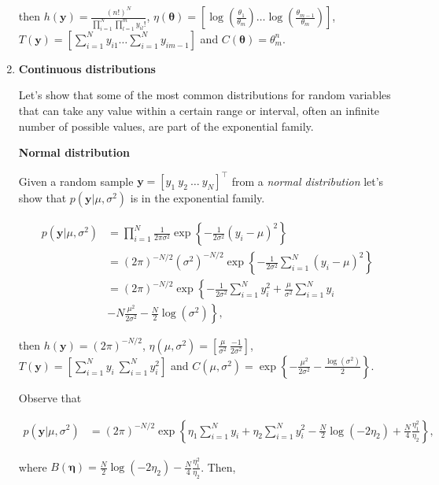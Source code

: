 \begin{enumerate}
then $h(\bm{y})=\frac{(n!)^N}{\prod_{i=1}^N\prod_{l=1}^m y_{il}!}$, $\eta(\bm{\theta})=\left[\log\left(\frac{\theta_1}{\theta_m}\right)\dots \log\left(\frac{\theta_{m-1}}{\theta_m}\right)\right]$, $T(\bm{y})=\left[\sum_{i=1}^N y_{i1}\dots \sum_{i=1}^N y_{im-1}\right]$ and $C(\bm{\theta})=\theta_m^n$.\\

\item \textbf{Continuous distributions}

Let's show that some of the most common distributions for random variables that can take any value within a certain range or interval, often an infinite number of possible values, are part of the exponential family.

\textbf{Normal distribution} 

Given a random sample $\bm{y}=[y_1 \ y_2 \ \dots \ y_N]^{\top}$ from a \textit{normal distribution} let's show that $p(\bm{y}|\mu,\sigma^2)$ is in the exponential family.

\begin{align}
	p(\bm{y}|\mu,\sigma^2)&=\prod_{i=1}^N \frac{1}{2\pi\sigma^2}\exp\left\{-\frac{1}{2\sigma^2}\left(y_i-\mu\right)^2\right\}\nonumber\\
	&= (2\pi)^{-N/2}(\sigma^2)^{-N/2}\exp\left\{-\frac{1}{2\sigma^2}\sum_{i=1}^N\left(y_i-\mu\right)^2\right\}\nonumber\\
	&= (2\pi)^{-N/2}\exp\left\{-\frac{1}{2\sigma^2}\sum_{i=1}^Ny_i^2+\frac{\mu}{\sigma^2}\sum_{i=1}^N y_i\right.\nonumber\\
	&-\left.N\frac{\mu^2}{2\sigma^2}-\frac{N}{2}\log(\sigma^2)\right\}\nonumber,	
\end{align}

then $h(\bm{y})=(2\pi)^{-N/2}$, $\eta(\mu,\sigma^2)=\left[\frac{\mu}{\sigma^2} \ \frac{-1}{2\sigma^2}\right]$, $T(\bm{y})=\left[\sum_{i=1}^N y_i \ \sum_{i=1}^N y_i^2\right]$ and $C(\mu,\sigma^2)=\exp\left\{-\frac{\mu^2}{2\sigma^2}-\frac{\log(\sigma^2)}{2}\right\}$.

Observe that 

\begin{align}
	p(\bm{y}|\mu,\sigma^2)&= (2\pi)^{-N/2}\exp\left\{\eta_1\sum_{i=1}^N y_i+\eta_2\sum_{i=1}^Ny_i^2-\frac{N}{2}\log(-2\eta_2)+\frac{N}{4}\frac{\eta_1^2}{\eta_2}\right\}\nonumber,
\end{align}

where $B(\bm{\eta})=\frac{N}{2}\log(-2\eta_2)-\frac{N}{4}\frac{\eta_1^2}{\eta_2}$. Then,


\end{enumerate}
